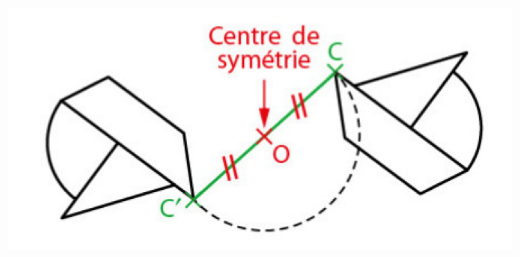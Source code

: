 \documentclass[12pt,a4paper]{article}
\begin{document}
\begin{center}
	\includegraphics[scale=.70]{fig2}
\end{center}
%
%
%

%
%
%


%
%
%
%
%
%
%
%
%
%
%
\end{document}
